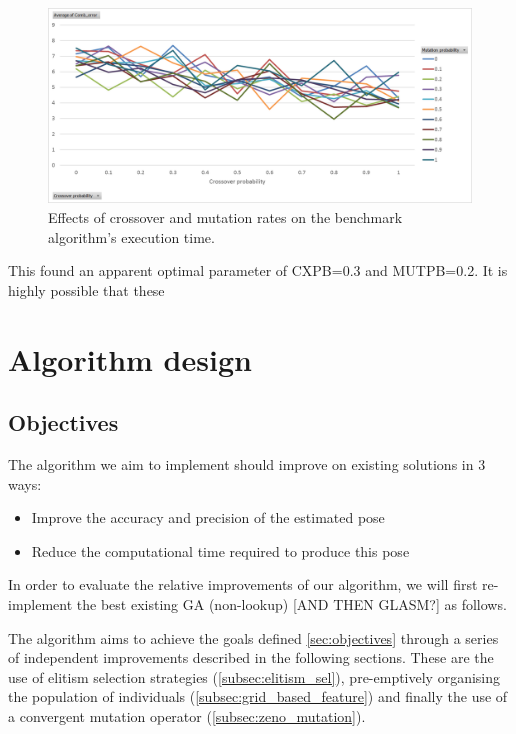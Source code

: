 \documentclass[authoryearcitations]{UoYCSproject}
\begin{document}
\begin{figure}[ht]
\centering
	\includegraphics[width=12cm,keepaspectratio]{images/ga_cxpb_mutpb.png}
	\caption{Effects of crossover and mutation rates on the benchmark algorithm's execution time.}
	\label{fig:ga_cxpb_mutpb}
\end{figure}


 This found an apparent optimal parameter of CXPB=0.3 and MUTPB=0.2. It is highly possible that these 

\chapter{Algorithm design}
\section{Objectives}
\label{sec:objectives}
The algorithm we aim to implement should improve on existing solutions in 3 ways:
\begin{itemize}
	\item Improve the accuracy and precision of the estimated pose
	\item Reduce the computational time required to produce this pose
\end{itemize}
In order to evaluate the relative improvements of our algorithm, we will first re-implement the best existing GA (non-lookup) [AND THEN GLASM?] as follows.

The algorithm aims to achieve the goals defined \autoref{sec:objectives} through a series of independent improvements described in the following sections. These are the use of elitism selection strategies (\autoref{subsec:elitism_sel}), pre-emptively organising the population of individuals (\autoref{subsec:grid_based_feature}) and finally the use of a convergent mutation operator (\autoref{subsec:zeno_mutation}).
\end{document}
